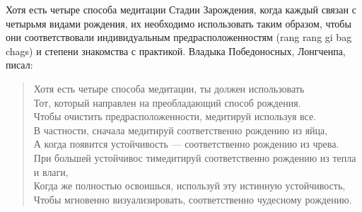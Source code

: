 Хотя есть четыре способа медитации Стадии Зарождения, когда каждый связан с
четырьмя видами рождения, их необходимо использовать таким образом, чтобы они
соответ\-ствовали индивидуальным предрасположенностям (rang rang gi bag chags) и степени
знакомства с практикой. Владыка Победоносных, Лонгченпа, писал:\\
\begin{verse}
\smallsize
Хотя есть четыре способа медитации, ты должен использовать \\
Тот, который направлен на преобладающий способ рождения. \\
Чтобы очистить предрасположенности, медитируй используя все.\\
В частности, сначала медитируй соответственно рождению из яйца,\\
А когда появится устойчивость — соответственно рождению из чрева.\\
При большей устойчивос тимедитируй соответственно рождению из тепла и влаги,\\
Когда же полностью освоишься, используй эту истинную устойчивость,\\
Чтобы мгновенно визуализировать, соответственно чудесному рождению.
\normalsize
\end{verse}
